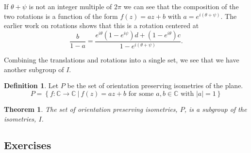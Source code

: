 \documentclass[
]{book}
\newtheorem{theorem}{Theorem}[chapter]
\theoremstyle{definition}
\newtheorem{definition}{Definition}[chapter]
\theoremstyle{definition}
\theoremstyle{definition}
\theoremstyle{definition}
\theoremstyle{remark}
\begin{document}
If \(\theta+\psi\) is not an integer multiple of \(2\pi\) we can see that the composition of the two rotations is a function of the form \(f(z)=az+b\) with \(a=e^{i(\theta+\psi)}\). The earlier work on rotations shows that this is a rotation centered at \[\frac{b}{1-a} = \frac{e^{i\theta} \left(1-e^{i\psi}\right) d + (1-e^{i\theta}) c}{1-e^{i(\theta+\psi)}}.\]

Combining the translations and rotations into a single set, we see that we have another subgroup of \(I\).

\begin{definition}
Let \(P\) be the set of orientation preserving isometries of the plane. \[P = \left\{ f: \mathbb{C} \rightarrow \mathbb{C} \: \vert \:  f(z)=a z+b  \mbox{ for some } a, b \in \mathbb{C} \mbox{ with } |a|=1 \right\}\]
\end{definition}

\begin{theorem}
The set of orientation preserving isometries, \(P\), is a subgroup of the isometries, \(I\).
\end{theorem}

\hypertarget{exercises-53}{%
\subsection{Exercises}\label{exercises-53}}
\end{document}
